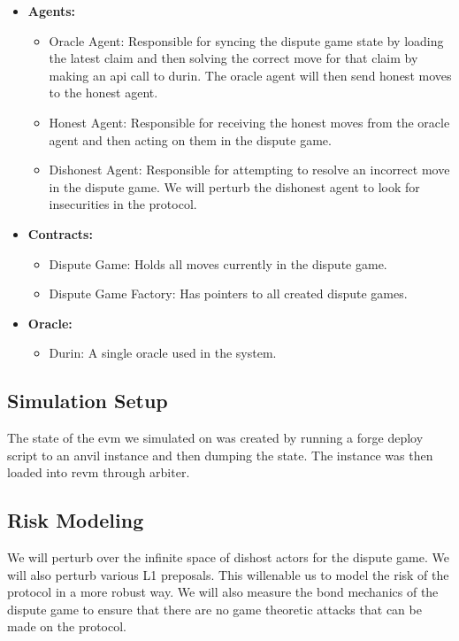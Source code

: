 \begin{itemize}
\item \textbf{Agents:}
  \begin{itemize}
  \item Oracle Agent: Responsible for syncing the dispute game state by loading the latest claim and then solving the correct move for that claim by making an api call to durin. The oracle agent will then send honest moves to the honest agent.
  \item Honest Agent: Responsible for receiving the honest moves from the oracle agent and then acting on them in the dispute game.
  \item Dishonest Agent: Responsible for attempting to resolve an incorrect move in the dispute game. We will perturb the dishonest agent to look for insecurities in the protocol.
  \end{itemize}
\item \textbf{Contracts:}
  \begin{itemize}
  \item Dispute Game: Holds all moves currently in the dispute game.
  \item Dispute Game Factory: Has pointers to all created dispute games.
  \end{itemize}
\item \textbf{Oracle:}
  \begin{itemize}
  \item Durin: A single oracle used in the system.
  \end{itemize}
\end{itemize}


\subsection{Simulation Setup}\label{simulation-setup}
The state of the evm we simulated on was created by running a forge deploy script to an anvil instance and then dumping the state. The instance was then loaded into revm through arbiter.

\subsection{Risk Modeling}\label{risk-modeling}

We will perturb over the infinite space of dishost actors for the
dispute game. We will also perturb various L1 preposals. This willenable us to model the risk of the protocol in a more robust way. We will also measure the bond mechanics of the dispute game to ensure that there are no game theoretic attacks that can be made on the protocol.

